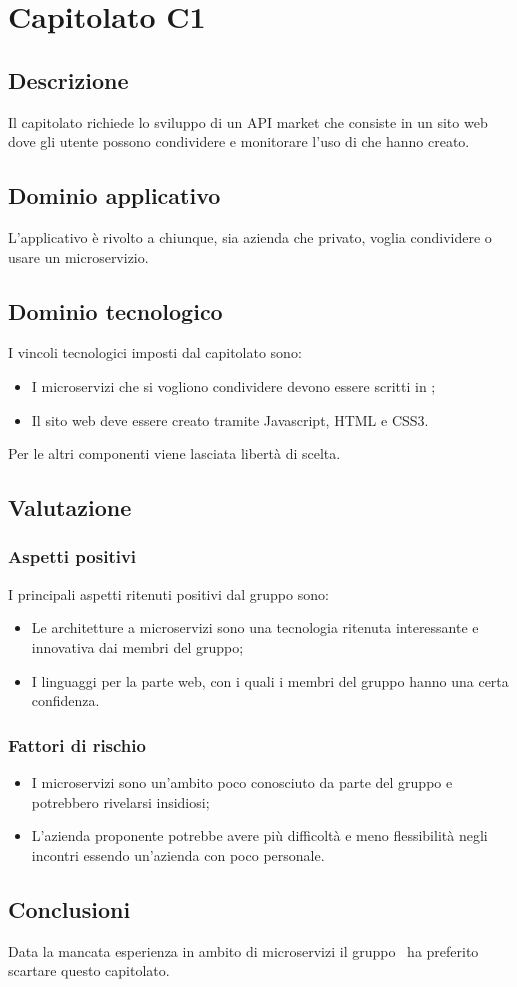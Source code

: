 \documentclass[../StudioDiFattibilita.tex]{subfiles}
\begin{document}
	\section{Capitolato C1}
		\subsection{Descrizione}
		Il capitolato richiede lo sviluppo di un API market che consiste in un sito web dove gli utente possono condividere e monitorare l'uso di  che hanno creato.
		\subsection{Dominio applicativo}
		L'applicativo è rivolto a chiunque, sia azienda che privato, voglia condividere o usare un microservizio.
		\subsection{Dominio tecnologico} 
		I vincoli tecnologici imposti dal capitolato sono:
		\begin{itemize}
			\item I microservizi che si vogliono condividere devono essere scritti in ;
			\item Il sito web deve essere creato tramite Javascript, HTML e CSS3.
		\end{itemize}
		Per le altri componenti viene lasciata libertà di scelta.
		\subsection{Valutazione}
			\subsubsection{Aspetti positivi}
			I principali aspetti ritenuti positivi dal gruppo sono:
				\begin{itemize}
				\item Le architetture a microservizi sono una tecnologia ritenuta interessante e innovativa dai membri del gruppo; 
				\item I linguaggi per la parte web, con i quali i membri del gruppo hanno una certa confidenza.
			\end{itemize}
			\subsubsection{Fattori di rischio}
				\begin{itemize}
				\item I microservizi sono un'ambito poco conosciuto da parte del gruppo e potrebbero rivelarsi insidiosi;
				\item L'azienda proponente potrebbe avere più difficoltà e meno flessibilità negli incontri essendo un'azienda con poco personale.
			\end{itemize}
			\subsection{Conclusioni}
			Data la mancata esperienza in ambito di microservizi il gruppo \kaleidoscode\ ha preferito scartare questo capitolato.
\end{document}
